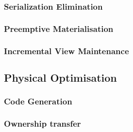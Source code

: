 \subsubsection{Serialization Elimination}

\subsubsection{Preemptive Materialisation}

\subsubsection{Incremental View Maintenance}

\subsection{Physical Optimisation}


\subsubsection{Code Generation}


\subsubsection{Ownership transfer}
